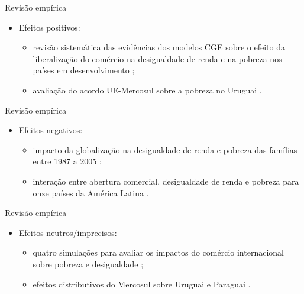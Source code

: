 \documentclass[10pt]{sintefbeamer}
\begin{document}
\begin{frame}{Revisão empírica}
	\begin{itemize}
		\item Efeitos positivos:
		
		\begin{itemize}[<+->]
			\item revisão sistemática das evidências dos modelos CGE sobre o efeito da liberalização do comércio na desigualdade de renda e na pobreza nos países em desenvolvimento \cite{anderson20};
			
			\item avaliação do acordo UE-Mercosul sobre a pobreza no Uruguai \cite{estrades12}.
		\end{itemize}
	\end{itemize}
\end{frame}

\begin{frame}{Revisão empírica}
	\begin{itemize}
		\item Efeitos negativos:
		
		\begin{itemize}[<+->]
			\item impacto da globalização na desigualdade de renda e pobreza das famílias entre 1987 a 2005 \cite{castilho12};
			
			\item interação entre abertura comercial, desigualdade de renda e pobreza para onze países da América Latina \cite{bayarsezgin17}.
		\end{itemize}
	\end{itemize}
\end{frame}

\begin{frame}{Revisão empírica}
	\begin{itemize}
		\item Efeitos neutros/imprecisos:
		
		\begin{itemize}[<+->]
			\item quatro simulações para avaliar os impactos do comércio internacional sobre pobreza e desigualdade \cite{carneiroarbache03};
			
			\item efeitos distributivos do Mercosul sobre Uruguai e Paraguai \cite{borrazetal12}.
		\end{itemize}
	\end{itemize}
\end{frame}
\end{document}
